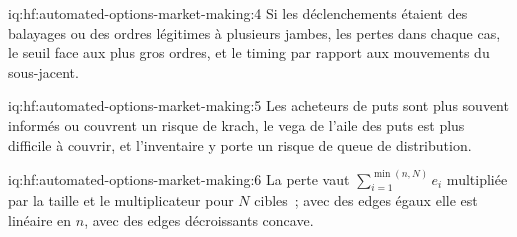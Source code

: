 \begin{solution}{iq:hf:automated-options-market-making:4}
Si les déclenchements étaient des balayages ou des ordres légitimes à plusieurs jambes, les pertes dans chaque cas, le seuil face aux plus gros ordres, et le timing par rapport
aux mouvements du sous-jacent.
\end{solution}

\begin{solution}{iq:hf:automated-options-market-making:5}
Les acheteurs de puts sont plus souvent informés ou couvrent un risque de krach, le vega de l'aile des puts est plus difficile à couvrir, et l'inventaire y porte un risque de queue de distribution.
\end{solution}

\begin{solution}{iq:hf:automated-options-market-making:6}
La perte vaut $\sum_{i=1}^{\min(n,N)}e_i$ multipliée par la taille et le multiplicateur pour $N$ cibles~; avec des edges égaux elle est linéaire en $n$, avec des edges décroissants
concave.
\end{solution}
